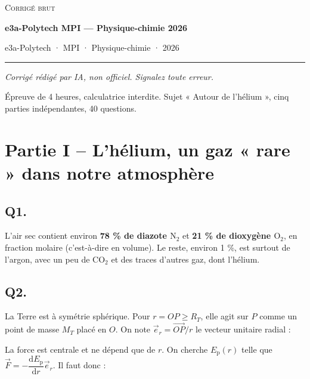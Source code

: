 \documentclass[11pt,a4paper]{article}
\newcommand{\equationajustee}[1]{%
  \sbox{\boiteequation}{$\displaystyle #1$}%
  \ifdim\wd\boiteequation>\linewidth
    \[\resizebox{\linewidth}{!}{\usebox{\boiteequation}}\]%
  \else
    \[#1\]%
  \fi}
\begin{document}
\thispagestyle{plain}
\begin{center}
  {\small\scshape Corrigé brut}\par\smallskip
  {\LARGE\bfseries e3a-Polytech MPI — Physique-chimie 2026\par}\medskip
  {\large e3a-Polytech · MPI · Physique-chimie · 2026\par}
\end{center}
\vspace{2pt}\hrule\vspace{8pt}

\emph{Corrigé rédigé par IA, non officiel. Signalez toute erreur.}

Épreuve de 4 heures, calculatrice interdite. Sujet « Autour de l'hélium », cinq parties indépendantes, 40 questions.

\hypertarget{partie-i-lhuxe9lium-un-gaz-rare-dans-notre-atmosphuxe8re}{%
\section{Partie I -- L'hélium, un gaz « rare » dans notre atmosphère}\label{partie-i-lhuxe9lium-un-gaz-rare-dans-notre-atmosphuxe8re}}

\hypertarget{q1.}{%
\subsection{Q1.}\label{q1.}}

L'air sec contient environ \textbf{78 \% de diazote \(\mathrm{N_2}\)} et \textbf{21 \% de dioxygène \(\mathrm{O_2}\)}, en fraction molaire (c'est-à-dire en volume). Le reste, environ 1 \%, est surtout de l'argon, avec un peu de \(\mathrm{CO_2}\) et des traces d'autres gaz, dont l'hélium.

\hypertarget{q2.}{%
\subsection{Q2.}\label{q2.}}

La Terre est à symétrie sphérique. Pour \(r=OP\ge R_T\), elle agit sur \(P\) comme un point de masse \(M_T\) placé en \(O\). On note \(\vec e_r=\overrightarrow{OP}/r\) le vecteur unitaire radial :

\equationajustee{\boxed{\vec F=-\frac{GM_Tm}{r^2}\,\vec e_r}}

La force est centrale et ne dépend que de \(r\). On cherche \(E_{\mathrm p}(r)\) telle que \(\vec F=-\dfrac{\mathrm dE_{\mathrm p}}{\mathrm dr}\vec e_r\). Il faut donc :
\end{document}
